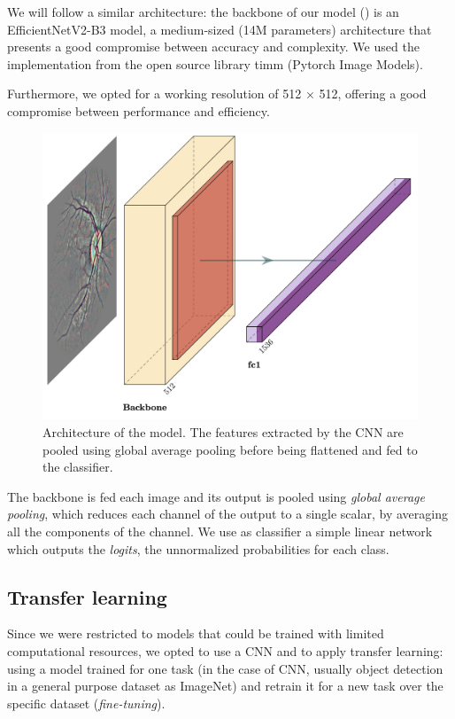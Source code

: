 We will follow a similar architecture: the backbone of our model () is an EfficientNetV2-B3 model, a medium-sized (14M parameters) architecture that presents a good compromise between accuracy and complexity. We used the implementation from the open source library timm \cite{timm} (Pytorch Image Models). 

Furthermore, we opted for a working resolution of 512 × 512, offering a good compromise between performance and efficiency. 

\begin{figure}[ht]
    \centering
    \includegraphics[scale=0.3]{figures/chapter5/models/model.png}
    \caption{Architecture of the model. The features extracted by the CNN are pooled using global average pooling before being flattened and fed to the classifier.}
    \label{fig:architecture}
\end{figure}

The backbone is fed each image and its output is pooled using \textit{global average pooling}, which reduces each channel of the output to a single scalar, by averaging all the components of the channel. We use as classifier a simple linear network which outputs the \textit{logits}, the unnormalized probabilities for each class.

\subsection{Transfer learning}
Since we were restricted to models that could be trained with limited computational resources, we opted to use a CNN and to apply transfer learning: using a model trained for one task (in the case of CNN, usually object detection in a general purpose dataset as ImageNet) and retrain it for a new task over the specific dataset (\textit{fine-tuning}).

